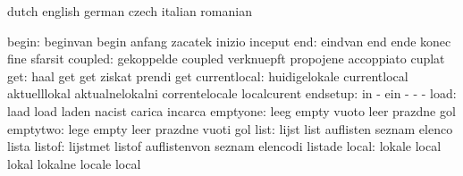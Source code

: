 

\startelements             dutch                     english
                           german                    czech
                           italian                   romanian

                    begin: beginvan                  begin
                           anfang                    zacatek
                           inizio                    inceput
                      end: eindvan                   end
                           ende                      konec
                           fine                      sfarsit
                  coupled: gekoppelde                coupled
                           verknuepft                propojene
                           accoppiato                cuplat
                      get: haal                      get
                           get                       ziskat
                           prendi                    get
             currentlocal: huidigelokale             currentlocal
                           aktuelllokal              aktualnelokalni
                           correntelocale            localcurent
                 endsetup: in                        -
                           ein                       -
                           -                         -
                     load: laad                      load
                           laden                     nacist
                           carica                    incarca
                 emptyone: leeg                      empty
                           vuoto                     leer
                           prazdne                   gol
                 emptytwo: lege                      empty
                           leer                      prazdne
                           vuoti                     gol
                     list: lijst                     list
                           auflisten                 seznam
                           elenco                    lista
                   listof: lijstmet                  listof
                           auflistenvon              seznam
                           elencodi                  listade
                    local: lokale                    local
                           lokal                     lokalne
                           locale                    local
